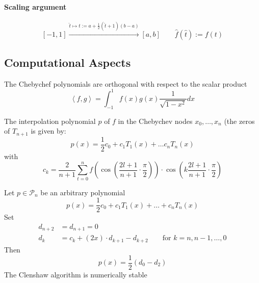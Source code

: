	\paragraph{Scaling argument}
	\[
	 [-1,1] \xrightarrow{\hat t \mapsto t:= a + \frac{1}{2}(\hat t+1)(b-a) } [a,b] \qquad \hat f(\hat t) := f(t)
	\]

	\subsection{Computational Aspects}
		\begin{theorem}
			The Chebychef polynomials are orthogonal with respect to the scalar product
			\[
			 \left< f,g \right> = \int_{-1}^1 f(x) g(x)\frac{1}{\sqrt{1-x^2}} dx
			\]		 
		\end{theorem}

		\begin{theorem}
		 The interpolation polynomial $p$ of $f$ in the Chebychev nodes $x_0, \ldots, x_n$ (the zeros of $T_{n+1}$ is given by:
		 \[
		  p(x) = \frac{1}{2}c_0 + c_1 T_1(x) + \ldots c_n T_n(x)
		 \]
		 with
		 \[
		  c_k = \frac{2}{n+1}\sum_{t=0}^n f \left( \cos\left(\frac{2l+1}{n+1}\cdot \frac{\pi}{2}\right) \right) \cdot \cos \left( k\frac{2l+1}{n+1}\cdot \frac{\pi}{2}\right)
		 \]
		\end{theorem}
		
		\begin{theorem}
		Let $p\in \mathcal P_n$ be an arbitrary polynomial
		\[
		 p(x) = \frac{1}{2}c_0 +c_1 T_1(x) +\ldots + c_n T_n(x)
		\]
		 Set
		 \begin{align*}
		  d_{n+2} &= d_{n+1} = 0\\
		  d_k &= c_k+(2x)\cdot d_{k+1}-d_{k+2} \qquad \text{for } k=n, n-1,\ldots,0
		 \end{align*}
		 Then
		 \[
		  p(x) = \frac{1}{2}(d_0-d_2)
		 \]
		 The Clenshaw algorithm is numerically stable
		\end{theorem}

